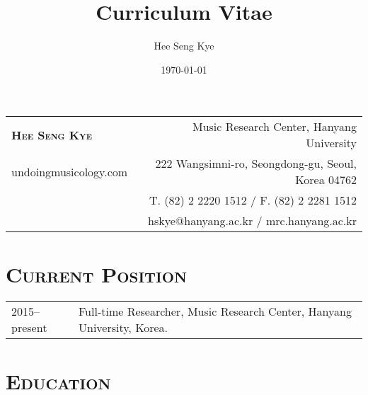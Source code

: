\documentclass[a4paper,11pt]{article}
\title{Curriculum Vitae}
\author{Hee Seng Kye}
\date{\today}
\begin{document}
  \renewcommand{\headrulewidth}{0pt}
  \fancyhf{}
 
  \fancyfoot[RE,RO]{\small \thepage}
  
  \raggedright \parindent=15pt
  
%  
%  
  
  \hspace*{-0.8cm}
  \begin{tabular}{p{7.26cm} r}
    {\LARGE \textsc{\textbf{Hee Seng Kye}}} & Music Research Center, Hanyang University\\
    undoingmusicology.com & 222 Wangsimni-ro, Seongdong-gu, Seoul, Korea 04762\\
    & T. (82) 2 2220 1512 / F. (82) 2 2281 1512\\
    & hskye@hanyang.ac.kr / mrc.hanyang.ac.kr
  \end{tabular}
  
  \vspace{5mm}
  
  \section*{\textsc{Current Position}}
  
  \hspace*{-0.25cm}
  \begin{tabular}{p{2.5cm} l}
    2015--present & Full-time Researcher, Music Research Center, Hanyang University, Korea.
  \end{tabular}
  
  \vspace*{2.5mm}
  
  \section*{\textsc{Education}}
  
\end{document}
